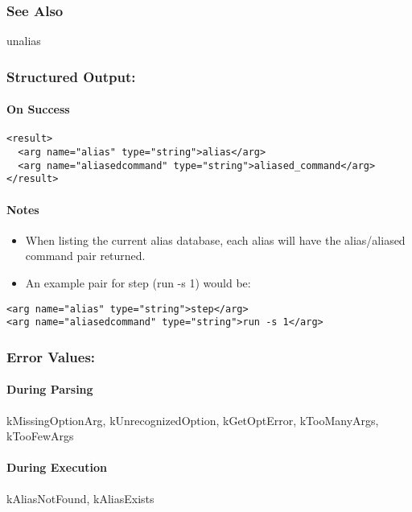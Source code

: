 \subsubsection*{See Also}
 unalias
\subsubsection*{Structured Output:}
\paragraph*{On Success}
\begin{verbatim}
<result>
  <arg name="alias" type="string">alias</arg>
  <arg name="aliasedcommand" type="string">aliased_command</arg>
</result>
\end{verbatim}
\paragraph*{Notes}
\begin{itemize}
\item  When listing the current alias database, each alias will have the alias/aliased command pair returned. 
\item  An example pair for step (run -s 1) would be: 
\end{itemize}
\begin{verbatim}
<arg name="alias" type="string">step</arg>
<arg name="aliasedcommand" type="string">run -s 1</arg>
\end{verbatim}
\subsubsection*{Error Values:}
\paragraph*{During Parsing}
 kMissingOptionArg, kUnrecognizedOption, kGetOptError, kTooManyArgs, kTooFewArgs
\paragraph*{During Execution}
 kAliasNotFound, kAliasExists
